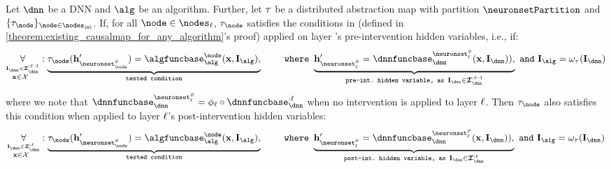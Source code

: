 \begin{lemma}\label{lemma:post_intervention_first_condition}
    Let $\dnn$ be a DNN and $\alg$ be an algorithm.
    Further, let $\tau$ be a distributed abstraction map with partition $\neuronsetPartition$ and $\{\abstractionmap_\node\}_{\node \in \nodesint}$.
    If, for all $\node \in \nodes_{\layer}$, $\abstractionmap_\node$ satisfies
    the conditions in  (defined in \cref{theorem:existing_causalmap_for_any_algorithm}'s proof) applied on layer \boldsymbol{$\layer$}'s pre-intervention hidden variables, i.e., if:
    \begin{align}
        \myforall\limits_{\overset{\interventionsdnn \in \interventionsset^{:\layer\!-\!1}_{\dnn}}{\bx\in\calX\,\,\,\,}}:
        \underbrace{\abstractionmap_{\node}(\hiddenstates'_{\neuronset^{\causalmap}_{\node}}) = \algfuncnode{\node}(\bx, \interventions_{\alg}),}_{\texttt{tested condition}} 
        \qquad
        \,\,\mathtt{where}\,\,
        \underbrace{\hiddenstates'_{\neuronset^{\causalmap}_{\layer}} = \dnnfunclayer{\neuronset^{\causalmap}_{\layer}}(\bx, \interventionsdnn)),}_{\!\!\!\!\!\!\!\!\!\!\!\!\!\!\!\!\!\!\!\!\!\!\!\!\!\!\!\!\!\!\!\!\!\!\!\!\!\!\!\!\!\!\!\!\!\!\!\!
        \texttt{pre-int.\ hidden variable, as }\interventionsdnn \in \interventionsset^{:\layer\!-\!1}_{\dnn}
        \!\!\!\!\!\!\!\!\!\!\!\!\!\!\!\!\!\!\!\!\!\!\!\!\!\!\!\!\!\!\!\!\!\!\!\!\!\!\!\!\!\!\!\!\!\!\!\!}
        \,\,\mathtt{and}\,\,
        \interventions_{\alg} = \omega_{\abstractionmap}(\interventionsdnn)
    \end{align}
    where we note that $\dnnfunclayer{\neuronset^{\causalmap}_{\layer}} = \causalmap_{\layer} \circ \dnnfunclayer{:\layer}$ when no intervention is applied to layer $\layer$.
    Then $\abstractionmap_{\node}$ also satisfies this condition when applied to layer $\layer$'s post-intervention hidden variables:
    \begin{align}
        \myforall\limits_{\overset{\interventionsdnn \in \interventionsset^{:\layer}_{\dnn}}{\bx\in\calX\,\,\,\,}}:
        \underbrace{\abstractionmap_{\node}(\hiddenstates'_{\neuronset^{\causalmap}_{\node}}) = \algfuncnode{\node}(\bx, \interventions_{\alg}),}_{\texttt{tested condition}} 
        \qquad
        \,\,\mathtt{where}\,\,
        \underbrace{\hiddenstates'_{\neuronset^{\causalmap}_{\layer}} = \dnnfunclayer{\neuronset^{\causalmap}_{\layer}}(\bx, \interventionsdnn)),}_{\!\!\!\!\!\!\!\!\!\!\!\!\!\!\!\!\!\!\!\!\!\!\!\!\!\!\!\!\!\!\!\!\!\!\!\!\!\!\!\!\!\!\!\!\!\!\!\!
        \texttt{post-int.\ hidden variable, as }\interventionsdnn \in \interventionsset^{:\layer}_{\dnn}
        \!\!\!\!\!\!\!\!\!\!\!\!\!\!\!\!\!\!\!\!\!\!\!\!\!\!\!\!\!\!\!\!\!\!\!\!\!\!\!\!\!\!\!\!\!\!\!\!}
        \,\,\mathtt{and}\,\,
        \interventions_{\alg} = \omega_{\abstractionmap}(\interventionsdnn)
    \end{align}
\end{lemma}
